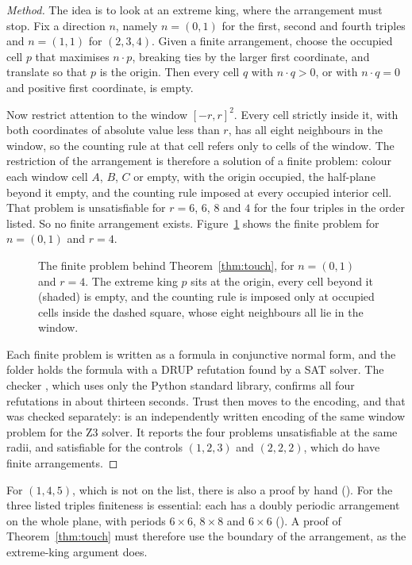 \documentclass[11pt]{amsart}
\theoremstyle{remark}
\begin{document}
\begin{proof}[Method]
The idea is to look at an extreme king, where the arrangement must stop. Fix a direction $n$, namely
$n=(0,1)$ for the first, second and fourth triples and $n=(1,1)$ for $(2,3,4)$. Given a finite
arrangement, choose the occupied cell $p$ that maximises $n\cdot p$, breaking ties by the larger
first coordinate, and translate so that $p$ is the origin. Then every cell $q$ with $n\cdot q>0$, or
with $n\cdot q=0$ and positive first coordinate, is empty.

Now restrict attention to the window $[-r,r]^2$. Every cell strictly inside it, with both
coordinates of absolute value less than $r$, has all eight neighbours in the window, so the counting
rule at that cell refers only to cells of the window. The restriction of the arrangement is therefore
a solution of a finite problem: colour each window cell $A$, $B$, $C$ or empty, with the origin
occupied, the half-plane beyond it empty, and the counting rule imposed at every occupied interior
cell. That problem is unsatisfiable for $r=6$, $6$, $8$ and $4$ for the four triples in the order
listed. So no finite arrangement exists. Figure~\ref{fig:window} shows the finite problem for $n=(0,1)$ and $r=4$.

\begin{figure}[ht]
\centering

\caption{The finite problem behind Theorem~\ref{thm:touch}, for $n=(0,1)$ and $r=4$. The extreme
king $p$ sits at the origin, every cell beyond it (shaded) is empty, and the counting rule is imposed
only at occupied cells inside the dashed square, whose eight neighbours all lie in the window.}
\label{fig:window}
\end{figure}

Each finite problem is written as a formula in conjunctive normal form, and the folder
 holds the formula with a DRUP refutation found by a SAT
solver. The checker , which uses only the Python standard library, confirms
all four refutations in about thirteen seconds. Trust then moves to the encoding, and that was
checked separately:  is an independently written encoding of the same window
problem for the Z3 solver. It reports the four problems unsatisfiable at the same radii, and
satisfiable for the controls $(1,2,3)$ and $(2,2,2)$, which do have finite arrangements.
\end{proof}

For $(1,4,5)$, which is not on the list, there is also a proof by hand
(). For the three listed triples finiteness is essential: each has
a doubly periodic arrangement on the whole plane, with periods $6\times6$, $8\times8$ and $6\times6$
(). A proof of Theorem~\ref{thm:touch} must therefore use the boundary of the
arrangement, as the extreme-king argument does.
\end{document}
